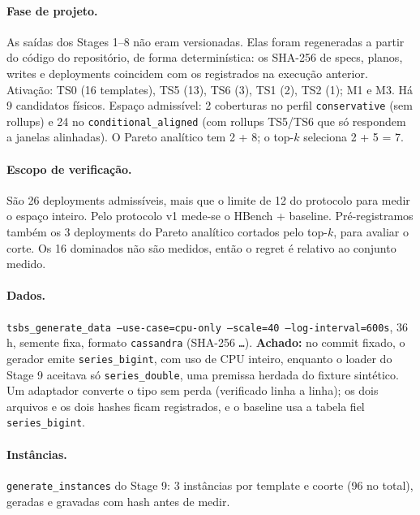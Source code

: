\documentclass[11pt,a4paper]{article}
\begin{document}
\paragraph{Fase de projeto.} As saídas dos Stages 1--8 não eram versionadas. Elas foram regeneradas a partir do código do repositório, de forma determinística: os SHA-256 de specs, planos, writes e deployments coincidem com os registrados na execução anterior. Ativação: TS0 (16 templates), TS5 (13), TS6 (3), TS1 (2), TS2 (1); M1 e M3. Há 9 candidatos físicos. Espaço admissível: 2 coberturas no perfil \texttt{conservative} (sem rollups) e 24 no \texttt{conditional\_aligned} (com rollups TS5/TS6 que só respondem a janelas alinhadas). O Pareto analítico tem 2 + 8; o top-$k$ seleciona 2 + 5 = 7.

\paragraph{Escopo de verificação.} São 26 deployments admissíveis, mais que o limite de 12 do protocolo para medir o espaço inteiro. Pelo protocolo v1 mede-se o HBench + baseline. Pré-registramos também os 3 deployments do Pareto analítico cortados pelo top-$k$, para avaliar o corte. Os 16 dominados não são medidos, então o regret é relativo ao conjunto medido.

\paragraph{Dados.} \texttt{tsbs\_generate\_data --use-case=cpu-only --scale=40 --log-interval=600s}, 36\,h, semente fixa, formato \texttt{cassandra} (SHA-256 \texttt{\envdatasha\ldots}). \textbf{Achado:} no commit fixado, o gerador emite \texttt{series\_bigint}, com uso de CPU inteiro, enquanto o loader do Stage 9 aceitava só \texttt{series\_double}, uma premissa herdada do fixture sintético. Um adaptador converte o tipo sem perda (verificado linha a linha); os dois arquivos e os dois hashes ficam registrados, e o baseline usa a tabela fiel \texttt{series\_bigint}.

\paragraph{Instâncias.} \texttt{generate\_instances} do Stage 9: 3 instâncias por template e coorte (96 no total), geradas e gravadas com hash antes de medir.
\end{document}
